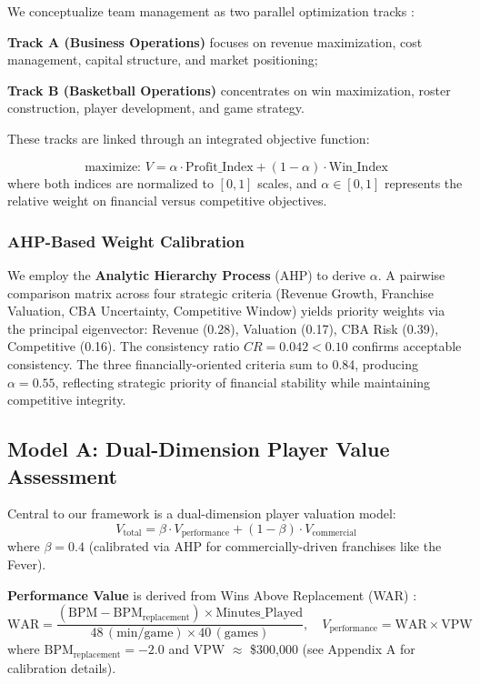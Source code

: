 \documentclass{mcmthesis}
\begin{document}
We conceptualize team management as two parallel optimization tracks \cite{dietl2011}: 

\textbf{Track A (Business Operations)} focuses on revenue maximization, cost management, capital structure, and market positioning; 

\textbf{Track B (Basketball Operations)} concentrates on win maximization, roster construction, player development, and game strategy. 

These tracks are linked through an integrated objective function:

\begin{equation}
\text{maximize: } V = \alpha \cdot \text{Profit\_Index} + (1-\alpha) \cdot \text{Win\_Index}
\end{equation}
where both indices are normalized to $[0,1]$ scales, and $\alpha \in [0,1]$ represents the relative weight on financial versus competitive objectives.

\subsubsection{AHP-Based Weight Calibration}
We employ the \textbf{Analytic Hierarchy Process} (AHP) \cite{saaty1980} to derive $\alpha$. A pairwise comparison matrix across four strategic criteria (Revenue Growth, Franchise Valuation, CBA Uncertainty, Competitive Window) yields priority weights via the principal eigenvector: Revenue (0.28), Valuation (0.17), CBA Risk (0.39), Competitive (0.16). The consistency ratio $CR = 0.042 < 0.10$ confirms acceptable consistency. The three financially-oriented criteria sum to 0.84, producing $\alpha = 0.55$, reflecting strategic priority of financial stability while maintaining competitive integrity.

\subsection{Model A: Dual-Dimension Player Value Assessment}
Central to our framework is a dual-dimension player valuation model:
\begin{equation}
V_{\text{total}} = \beta \cdot V_{\text{performance}} + (1-\beta) \cdot V_{\text{commercial}}
\end{equation}
where $\beta = 0.4$ (calibrated via AHP for commercially-driven franchises like the Fever).

\textbf{Performance Value} is derived from Wins Above Replacement (WAR) \cite{kubatko2007}:
\begin{equation}
\text{WAR} = \frac{(\text{BPM} - \text{BPM}_{\text{replacement}}) \times \text{Minutes\_Played}}{48\,(\text{min/game}) \times 40\,(\text{games})}, \quad V_{\text{performance}} = \text{WAR} \times \text{VPW}
\end{equation}
where $\text{BPM}_{\text{replacement}} = -2.0$ and VPW $\approx$ \$300,000 (see Appendix A for calibration details).
\end{document}
